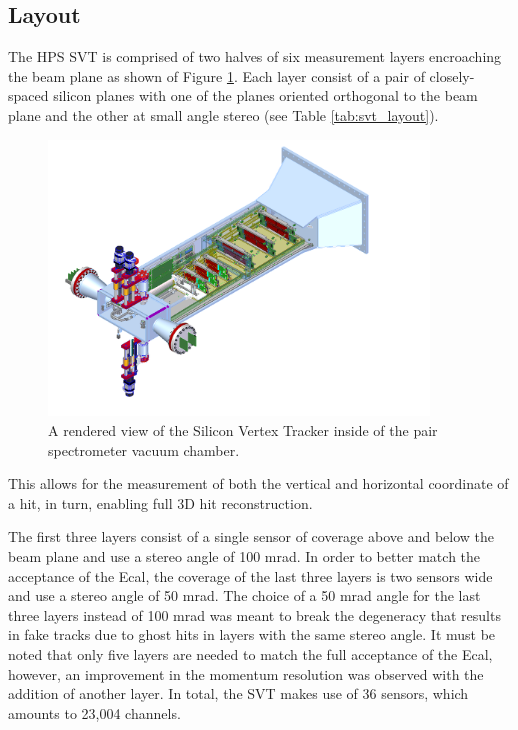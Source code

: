 \subsection{Layout}

The HPS SVT is comprised of two halves of six measurement layers encroaching the
beam plane as shown of Figure \ref{fig:svt_layout_render}. Each layer consist of a pair of
closely-spaced silicon planes with one of the planes oriented orthogonal to
the beam plane and the other at small angle stereo 
(see Table \ref{tab:svt_layout}).
\begin{figure}[h!t]
    \centering
    \includegraphics[width=0.9\textwidth]{images/svt_layout_render.png}
    \caption{A rendered view of the Silicon Vertex Tracker inside of the pair
             spectrometer vacuum chamber.}
    \label{fig:svt_layout_render}
\end{figure}
This allows
for the measurement of both the vertical and horizontal coordinate of a hit, in turn, 
enabling full 3D hit reconstruction.  

The first three layers consist of a single sensor of coverage above and below
the beam plane and use a stereo angle of 100 mrad. In order to better match the
acceptance of the Ecal, the coverage of the last three layers is two sensors 
wide and use a stereo angle of 50 mrad.  The choice of a 50 mrad angle for the
last three layers instead of 100 mrad was meant to break the degeneracy that
results in fake tracks
due to ghost hits in layers with the same stereo angle.  It must be noted that
only five layers are needed to match the full acceptance of the Ecal, however,
an improvement in the momentum resolution was observed with the addition of 
another layer.  In total, the SVT makes use of 36 sensors, which amounts to 
23,004 channels.

